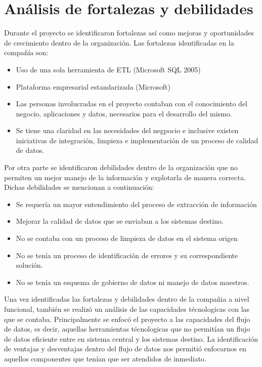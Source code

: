 \section{Análisis de fortalezas y debilidades}

Durante el proyecto se identificaron fortalezas así como mejoras y oportunidades
de crecimiento dentro de la organización. Las fortalezas identificadas en la
compañía son:

\begin{itemize}
\item Uso de una sola herramienta de ETL (Microsoft SQL 2005)
\item Plataforma empresarial estandarizada (Microsoft)
\item Las personas involucradas en el proyecto contaban con el conocimiento del
  negocio, aplicaciones y datos, necesarios para el desarrollo del mismo.
\item Se tiene una claridad en las necesidades del negpocio e inclusive existen
  iniciativas de integración, limpieza e implementación de un proceso de calidad
  de datos.
\end{itemize}

Por otra parte se identificaron debilidades dentro de la organización que no
permiten un mejor manejo de la información y explotarla de manera
correcta. Dichas debilidades se mencionan a continuación:

\begin{itemize}
\item Se requería un mayor entendimiento del proceso de extracción de
  información
\item Mejorar la calidad de datos que se enviaban a los sistemas destino.
\item No se contaba con un proceso de limpieza de datos en el sistema origen
\item No se tenía un proceso de identificación de errores y su correspondiente
  solución.
\item No se tenía un esquema de gobierno de datos ni manejo de datos maestros.
\end{itemize}

Una vez identificadas las fortalezas y debilidades dentro de la compañia a nivel
funcional, también se realizó un análisis de las capacidades técnologicas con
las que se contaba. Principalmente se enfocó el proyecto a las capacidades del
flujo de datos, es decir, aquellas herramientas técnologicas que no permitían un
flujo de datos eficiente entre en sistema central y los sistemas destino. La
identificación de ventajas y desventajas dentro del flujo de datos nos permitió
enfocarnos en aquellos componentes que tenían que ser atendidos de inmediato.

